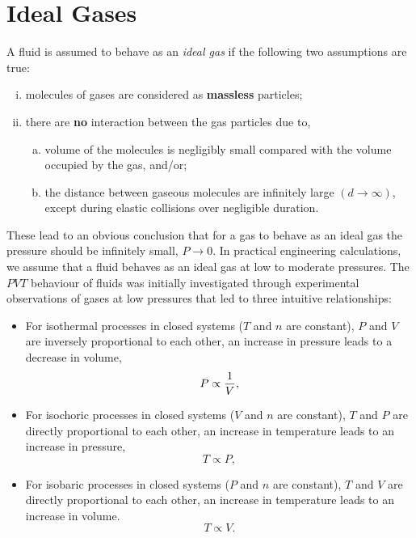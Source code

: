      \section{Ideal Gases}\label{Chapter:Intro_Property_of_Gases:Section:IdealGases}

     \noindent A fluid is assumed to behave as an {\it ideal gas} if the following two assumptions are true:
     \begin{enumerate}[i)]
       \item molecules of gases are considered as {\bf massless} particles;
       \item there are {\bf no} interaction between the gas particles due to,
         \begin{enumerate}[a)]
           \item volume of the molecules is negligibly small compared with the volume occupied by the gas, and/or;
           \item the distance between gaseous molecules are infinitely large $\left(d\rightarrow \infty\right)$, except during elastic collisions over negligible duration.
         \end{enumerate}
     \end{enumerate}
     \noindent These lead to an obvious conclusion that for a gas to behave as an ideal gas the pressure should be infinitely small, \ie $P\rightarrow 0$. In practical engineering calculations, we assume that a fluid behaves as an ideal gas at low to moderate pressures. The $PVT$ behaviour of fluids was initially investigated through experimental observations of gases at low pressures that led to three intuitive relationships:
     \begin{itemize}
       \item For isothermal processes in closed systems (\ie $T$ and $n$ are constant), $P$ and $V$ are inversely proportional to each other, \ie an increase in pressure leads to a decrease in volume,
          \begin{displaymath}
             P \propto \displaystyle\frac{1}{V},
          \end{displaymath}          
%          
       \item For isochoric processes in closed systems (\ie $V$ and $n$ are constant), $T$ and $P$ are directly proportional to each other, \ie an increase in temperature leads to an increase in pressure,
          \begin{displaymath}
            T \propto P,
          \end{displaymath}         
%
       \item For isobaric processes in closed systems (\ie $P$ and $n$ are constant), $T$ and $V$ are directly proportional to each other, \ie an increase in temperature leads to an increase in volume.
          \begin{displaymath}
            T\propto V.
          \end{displaymath}          
     \end{itemize}
